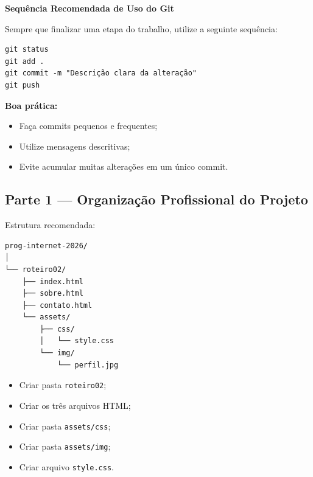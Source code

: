 \documentclass[12pt,a4paper]{article}
\begin{document}
\begin{boxDica}

\textbf{Sequência Recomendada de Uso do Git}

Sempre que finalizar uma etapa do trabalho, utilize a seguinte sequência:

\begin{boxCodigo}
\begin{verbatim}
git status
git add .
git commit -m "Descrição clara da alteração"
git push
\end{verbatim}
\end{boxCodigo}

\textbf{Boa prática:}
\begin{itemize}
\item Faça commits pequenos e frequentes;
\item Utilize mensagens descritivas;
\item Evite acumular muitas alterações em um único commit.
\end{itemize}

\end{boxDica}



\newpage

\subsection{Parte 1 — Organização Profissional do Projeto}

Estrutura recomendada:

\begin{boxCodigo}
\begin{verbatim}
prog-internet-2026/
│
└── roteiro02/
    ├── index.html
    ├── sobre.html
    ├── contato.html
    └── assets/
        ├── css/
        │   └── style.css
        └── img/
            └── perfil.jpg
\end{verbatim}
\end{boxCodigo}

\begin{boxAtividade}

\begin{itemize}
\item Criar pasta \texttt{roteiro02};
\item Criar os três arquivos HTML;
\item Criar pasta \texttt{assets/css};
\item Criar pasta \texttt{assets/img};
\item Criar arquivo \texttt{style.css}.
\end{itemize}

\end{boxAtividade}
\end{document}
